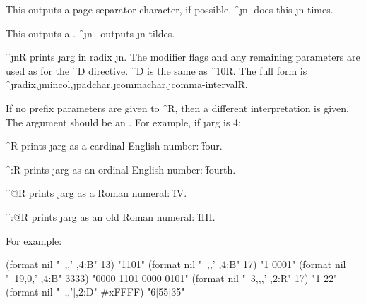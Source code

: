 

This outputs a page separator character, if possible.
\f{~\j{n}|} does this \j{n} times.

\endsubsubsection%



This outputs a .  \f{~\j{n}~} outputs \j{n} tildes.

\endsubsubsection%

\endsubsection%




\f{~\j{n}R} prints \j{arg} in radix \j{n}.
The modifier flags and any remaining parameters are used as for
the \f{~D} directive.
\f{~D} is the same as \f{~10R}.  
The full form is 
\f{~\j{radix},\j{mincol},\j{padchar},\j{commachar},\j{comma-interval}R}.

If no prefix parameters are given to \f{~R}, then a different
interpretation is given.  The argument should be an .
For example, if \j{arg} is 4:

\beginlist
\itemitem{\bull}
\f{~R} prints \j{arg} as a cardinal English number: \f{four}.

\itemitem{\bull}
\f{~:R} prints \j{arg} as an ordinal English number: \f{fourth}.

\itemitem{\bull}   
\f{~@R} prints \j{arg} as a Roman numeral: \f{IV}.

\itemitem{\bull}      
\f{~:@R} prints \j{arg} as an old Roman numeral: \f{IIII}.
\endlist

For example:

\code
 (format nil "~,,' ,4:B" 13) \EV "1101"
 (format nil "~,,' ,4:B" 17) \EV "1 0001"
 (format nil "~19,0,' ,4:B" 3333) \EV "0000 1101 0000 0101"
 (format nil "~3,,,' ,2:R" 17) \EV "1 22"
 (format nil "~,,'|,2:D" #xFFFF) \EV  "6|55|35"
\endcode
{}

